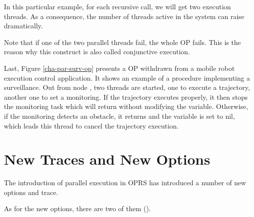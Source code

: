 In this particular example, for each recursive call, we will get two execution
threads. As a consequence, the number of threads active in the system can raise
dramatically. 

Note that if one of the two parallel threads fail, the whole OP fails. This is
the reason why this construct is also called conjunctive execution.

Last, Figure \ref{cha-par-surv-op} presents a OP withdrawn from a mobile robot
execution control application. It shows an example of a procedure implementing
a surveillance. Out from node , two threads are started, one to
execute a trajectory, another one to set a monitoring. If the trajectory
executes properly, it then stops the monitoring task which will return without
modifying the  variable.  Otherwise, if the monitoring detects an
obstacle, it returns and the  variable is set to nil, which leads
this thread to cancel the trajectory execution.



\section{New Traces and New Options}

The introduction of parallel execution in OPRS has introduced a number of new
options and trace.

As for the new options, there are two of them (). 

